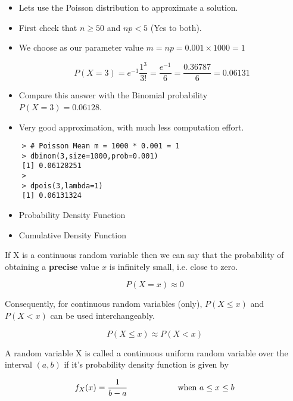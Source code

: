 \documentclass[]{article}
\begin{document}
	\begin{itemize}
		\item Lets use the Poisson distribution to approximate a solution.
		
		\item First check that $n \geq 50$ and $np <5$ (Yes to both).
		
		\item We choose as our parameter value $m = np = 0.001 \times 1000  = 1$
		
		\[P(X=3) = e^{-1}\frac{1^3}{3!} = \frac{e^{-1}}{6} = \frac{0.36787}{6} =  0.06131\]
		\item Compare this answer with the Binomial probability \\ $P(X=3) = 0.06128$.
		\item Very good approximation, with much less computation effort.
	\end{itemize}

	\begin{verbatim}
	> # Poisson Mean m = 1000 * 0.001 = 1
	> dbinom(3,size=1000,prob=0.001)
	[1] 0.06128251
	>
	> dpois(3,lambda=1)
	[1] 0.06131324
	\end{verbatim}
	


	
	\begin{itemize}
		\item Probability Density Function
		\item Cumulative Density Function
	\end{itemize}
	
	
	If X is a continuous random variable then we can say that the probability of obtaining a \textbf{precise} value $x$ is infinitely small, i.e. close to zero.
	
	\[P(X=x) \approx 0 \]
	
	Consequently, for continuous random variables (only),  $P(X \leq x)$ and $P(X < x)$ can be used interchangeably.
	
	\[P(X \leq x) \approx P(X < x) \]
	
	
	A random variable X is called a continuous uniform random variable over the interval $(a,b)$ if it's probability density function is given by
	
	\[ f_{X}(x)  =  { 1 \over b-a}   \hspace{2cm}  \mbox{ when } a \leq x \leq b\]
	
\end{document}
